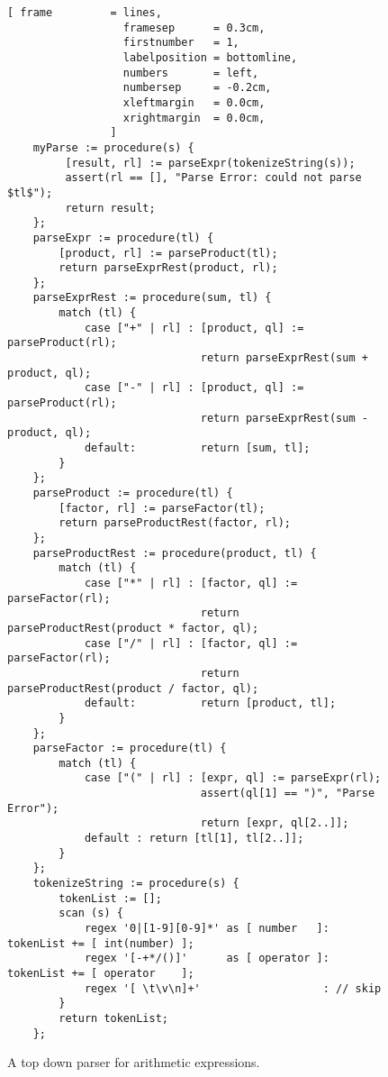 \begin{figure}[!ht]
\centering
\begin{Verbatim}[ frame         = lines, 
                  framesep      = 0.3cm, 
                  firstnumber   = 1,
                  labelposition = bottomline,
                  numbers       = left,
                  numbersep     = -0.2cm,
                  xleftmargin   = 0.0cm,
                  xrightmargin  = 0.0cm,
                ]
    myParse := procedure(s) {
         [result, rl] := parseExpr(tokenizeString(s));
         assert(rl == [], "Parse Error: could not parse $tl$");
         return result;
    };
    parseExpr := procedure(tl) {
        [product, rl] := parseProduct(tl);
        return parseExprRest(product, rl);
    };
    parseExprRest := procedure(sum, tl) {
        match (tl) {
            case ["+" | rl] : [product, ql] := parseProduct(rl);
                              return parseExprRest(sum + product, ql);
            case ["-" | rl] : [product, ql] := parseProduct(rl);
                              return parseExprRest(sum - product, ql);
            default:          return [sum, tl];
        }
    };
    parseProduct := procedure(tl) {
        [factor, rl] := parseFactor(tl);
        return parseProductRest(factor, rl);
    };
    parseProductRest := procedure(product, tl) {
        match (tl) {
            case ["*" | rl] : [factor, ql] := parseFactor(rl);
                              return parseProductRest(product * factor, ql);
            case ["/" | rl] : [factor, ql] := parseFactor(rl);
                              return parseProductRest(product / factor, ql);
            default:          return [product, tl];
        }
    };
    parseFactor := procedure(tl) {
        match (tl) {
            case ["(" | rl] : [expr, ql] := parseExpr(rl);
                              assert(ql[1] == ")", "Parse Error");
                              return [expr, ql[2..]];
            default : return [tl[1], tl[2..]];
        }
    };
    tokenizeString := procedure(s) {
        tokenList := [];
        scan (s) {
            regex '0|[1-9][0-9]*' as [ number   ]: tokenList += [ int(number) ];
            regex '[-+*/()]'      as [ operator ]: tokenList += [ operator    ];
            regex '[ \t\v\n]+'                   : // skip
        }
        return tokenList;
    };
\end{Verbatim}
\vspace*{-0.3cm}
\caption{A top down parser for arithmetic expressions.}
\label{fig:rd-parser.stlx}
\end{figure}

